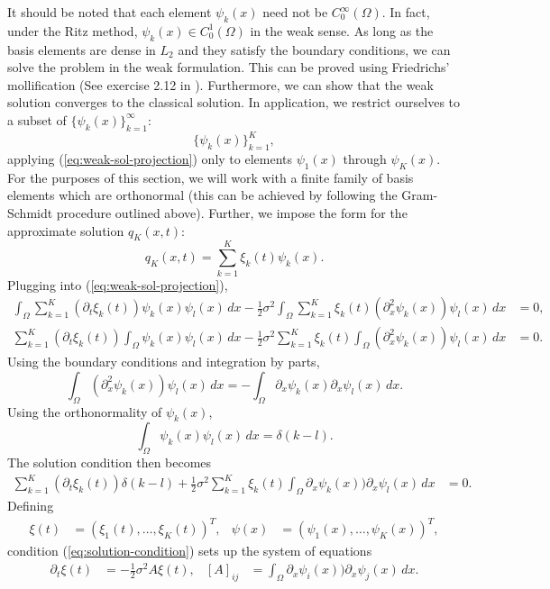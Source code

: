 \documentclass[10pt]{article}
\begin{document}
It should be noted that each element $\psi_k(x)$ need not be
$C^\infty_0(\Omega)$. In fact, under the Ritz method,
$\psi_k(x) \in C^1_0(\Omega)$ in the weak sense. As long as the basis
elements are dense in $L_2$ and they satisfy the boundary conditions,
we can solve the problem in the weak formulation. This can be proved
using Friedrichs' mollification (See exercise 2.12 in
\cite{zeidler1997math-phys}). Furthermore, we can show that the weak
solution converges to the classical solution. In application, we
restrict ourselves to a subset of $\{\psi_k(x)\}_{k=1}^\infty$:
\[
  \{\psi_k(x)\}_{k=1}^K,
\]
applying (\ref{eq:weak-sol-projection}) only to elements $\psi_1(x)$
through $\psi_K(x)$. For the purposes of this section, we will work
with a finite family of basis elements which are orthonormal (this can
be achieved by following the Gram-Schmidt procedure outlined
above). Further, we impose the form for the approximate solution $q_K(x,t)$:
\[
  q_K(x,t) = \sum_{k=1}^K \xi_k(t) \psi_k(x).
\]
Plugging into (\ref{eq:weak-sol-projection}),
\begin{align*}
  \displaystyle \int_\Omega \sum_{k=1}^K (\partial_t\xi_k(t))\psi_k(x) \psi_l(x)\, dx -
  \frac{1}{2}\sigma^2 \displaystyle \int_\Omega \sum_{k=1}^K \xi_k(t)(\partial^2_x\psi_k(x))  \psi_l(x)\,dx &= 0, \\
  \sum_{k=1}^K (\partial_t\xi_k(t)) \displaystyle \int_\Omega \psi_k(x) \psi_l(x)\, dx -
  \frac{1}{2}\sigma^2 \sum_{k=1}^K \xi_k(t) \displaystyle \int_\Omega (\partial^2_x\psi_k(x))  \psi_l(x)\,dx &= 0.
\end{align*}
Using the boundary conditions and integration by parts,
\[
  \displaystyle \int_\Omega (\partial^2_x\psi_k(x)) \psi_l(x)\,dx = -\displaystyle \int_\Omega \partial_x\psi_k(x)\partial_x\psi_l(x)\,dx.
\]
Using the orthonormality of $\psi_k(x)$,
\[
  \displaystyle \int_\Omega \psi_k(x) \psi_l(x)\, dx = \delta(k-l).
\]
The solution condition then becomes
\begin{align}
  \sum_{k=1}^K (\partial_t\xi_k(t)) \delta(k-l) +
  \frac{1}{2}\sigma^2 \sum_{k=1}^K \xi_k(t) \displaystyle \int_\Omega \partial_x\psi_k(x)) \partial_x\psi_l(x)\,dx &= 0. \label{eq:solution-condition}
\end{align}
Defining
\begin{align*}
  \xi(t) &= (\xi_1(t), \ldots, \xi_K(t))^T, & \psi(x) &= (\psi_1(x), \ldots, \psi_K(x))^T,
\end{align*}
condition (\ref{eq:solution-condition}) sets up the system of equations
\begin{align}
  \partial_t \xi(t) &= -\frac{1}{2}\sigma^2 A\xi(t), & [A]_{ij} &= \displaystyle \int_\Omega \partial_x\psi_i(x)) \partial_x\psi_j(x)\,dx. \label{eq:solution-ode}
\end{align}
\end{document}
